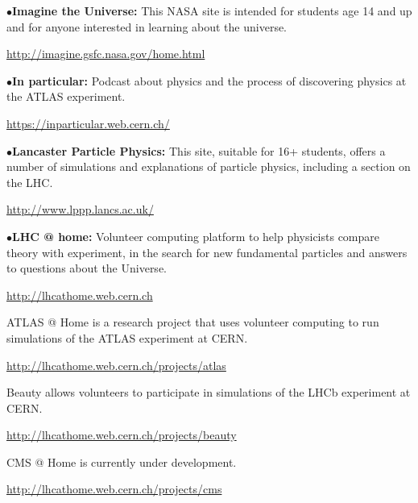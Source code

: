 \medskip

\item{$\bullet$}{\bf Imagine the Universe:}
This NASA site is intended for students age 14 and up and for anyone interested in learning about the universe.
	\item{}\qquad\url{http://imagine.gsfc.nasa.gov/home.html}


\smallskip

\item{$\bullet$}{\bf In particular:}
Podcast about physics and the process of discovering physics at the ATLAS experiment.
	\item{}\qquad\url{https://inparticular.web.cern.ch/}


\smallskip

\item{$\bullet$}{\bf Lancaster Particle Physics:}
This site, suitable for 16+ students,  offers a number of simulations and explanations of particle physics, including a section on the LHC.
	\item{}\qquad\url{http://www.lppp.lancs.ac.uk/}

\smallskip

\item{$\bullet$}{\bf LHC @ home:}
Volunteer computing platform to help physicists compare theory with experiment, in the search for new fundamental particles and answers to questions about the Universe.
	\item{}\qquad\url{http://lhcathome.web.cern.ch}

\smallskip

\item{}ATLAS @ Home is a research project that uses volunteer computing to run simulations of the ATLAS experiment at CERN.
	\item{}\qquad\url{http://lhcathome.web.cern.ch/projects/atlas}

\smallskip

\item{}Beauty allows volunteers to participate in simulations of the LHCb experiment at CERN.
	\item{}\qquad\url{http://lhcathome.web.cern.ch/projects/beauty}

\smallskip

\item{}CMS @ Home is currently under development.
	\item{}\qquad\url{http://lhcathome.web.cern.ch/projects/cms}

\smallskip

